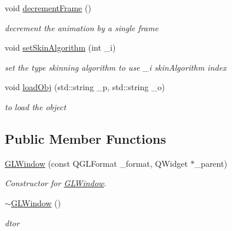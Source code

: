 \begin{DoxyCompactItemize}
void \hyperlink{class_g_l_window_a522cfc0a2d73b0c4ba0bbd9d57276332}{decrement\-Frame} ()
\begin{DoxyCompactList}\small\item\em decrement the animation by a single frame \end{DoxyCompactList}\item 
void \hyperlink{class_g_l_window_ae9e2ae76b50ffd6439c4e2bfc4191f3c}{set\-Skin\-Algorithm} (int \-\_\-i)
\begin{DoxyCompactList}\small\item\em set the type skinning algorithm to use \-\_\-i skin\-Algorithm index \end{DoxyCompactList}\item 
void \hyperlink{class_g_l_window_acaa420bbfa87d946ef7e8ff7820bb167}{load\-Obj} (std\-::string \-\_\-p, std\-::string \-\_\-o)
\begin{DoxyCompactList}\small\item\em to load the object \end{DoxyCompactList}\end{DoxyCompactItemize}
\subsection*{Public Member Functions}
\begin{DoxyCompactItemize}
\item 
\hyperlink{class_g_l_window_a54ae7036a8f059e9ea6a3b91064837c8}{G\-L\-Window} (const Q\-G\-L\-Format \-\_\-format, Q\-Widget $\ast$\-\_\-parent)
\begin{DoxyCompactList}\small\item\em Constructor for \hyperlink{class_g_l_window}{G\-L\-Window}. \end{DoxyCompactList}\item 
\hyperlink{class_g_l_window_a2eeaea2148f4f72344edd6d1bac9759b}{$\sim$\-G\-L\-Window} ()
\begin{DoxyCompactList}\small\item\em dtor \end{DoxyCompactList}\end{DoxyCompactItemize}
